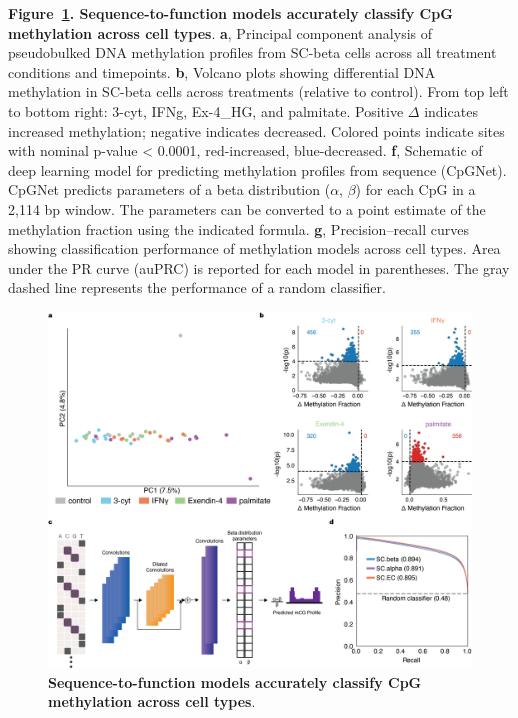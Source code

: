 \thispagestyle{plain}
\noindent
\textbf{Figure~\ref{fig:3 Figure 5}. Sequence-to-function models accurately classify CpG methylation across cell types}. \textbf{a}, Principal component analysis of pseudobulked DNA methylation profiles from SC-beta cells across all treatment conditions and timepoints. \textbf{b}, Volcano plots showing differential DNA methylation in SC-beta cells across treatments (relative to control). From top left to bottom right: 3-cyt, IFNg, Ex-4\_HG, and palmitate. Positive $\Delta$ indicates increased methylation; negative indicates decreased. Colored points indicate sites with nominal p-value < 0.0001, red-increased, blue-decreased. \textbf{f}, Schematic of deep learning model for predicting methylation profiles from sequence (CpGNet). CpGNet predicts parameters of a beta distribution ($\alpha$, $\beta$) for each CpG in a 2,114 bp window. The parameters can be converted to a point estimate of the methylation fraction using the indicated formula. \textbf{g}, Precision–recall curves showing classification performance of methylation models across cell types. Area under the PR curve (auPRC) is reported for each model in parentheses. The gray dashed line represents the performance of a random classifier.

\clearpage

\begin{figure}[!htbp]
    \centering
    \includegraphics[height=0.65\textheight, keepaspectratio]{3_figures-and-files/Fig5.png}
    \caption[Sequence-to-function models accurately classify CpG methylation across cell types]{\textbf{Sequence-to-function models accurately classify CpG methylation across cell types}.}
    \label{fig:3 Figure 5}
\end{figure}

